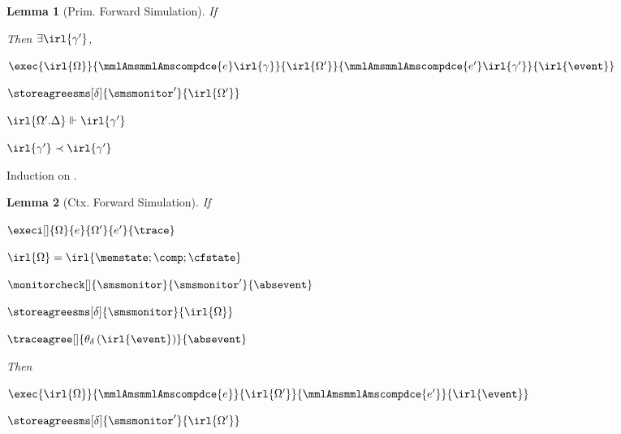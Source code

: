 \documentclass[a4paper,names,dvipsnames]{article}
\newtheorem{lemma}{Lemma}
\begin{document}
\begin{lemma}[Prim. Forward Simulation]\label{lem:sms:ctxforwardsim}
  If
  Then $\exists \irl{\gamma'}$,
  \begin{goals}
    \item $\exec{\irl{\Omega}}{\mmlAmsmmlAmscompdce{e}\irl{\gamma}}{\irl{\Omega'}}{\mmlAmsmmlAmscompdce{e'}\irl{\gamma'}}{\irl{\event}}$
    \item $\storeagreesms[\delta]{\smsmonitor'}{\irl{\Omega'}}$
    \item $\irl{\Omega'.\Delta}\Vdash\irl{\gamma'}$
    \item $\irl{\gamma'}\prec\irl{\gamma'}$
  \end{goals}
\end{lemma}
\begin{incompleteproof}
  Induction on .
\end{incompleteproof}

\begin{lemma}[Ctx. Forward Simulation]\label{lem:sms:ctxforwardsim}
  If
  \begin{assumptions}
    \item $\execi[]{\Omega}{e}{\Omega'}{e'}{\trace}$
    \item $\irl{\Omega}=\irl{\memstate;\comp;\cfstate}$
    \item $\monitorcheck[]{\smsmonitor}{\smsmonitor'}{\absevent}$
    \item $\storeagreesms[\delta]{\smsmonitor}{\irl{\Omega}}$
    \item $\traceagree[]{\theta_{\delta}\left(\irl{\event}\right)}{\absevent}$
  \end{assumptions}
  Then
  \begin{goals}
    \item $\exec{\irl{\Omega}}{\mmlAmsmmlAmscompdce{e}}{\irl{\Omega'}}{\mmlAmsmmlAmscompdce{e'}}{\irl{\event}}$
    \item $\storeagreesms[\delta]{\smsmonitor'}{\irl{\Omega'}}$
  \end{goals}
\end{lemma}
\begin{incompleteproof}
\end{incompleteproof}
\end{document}
